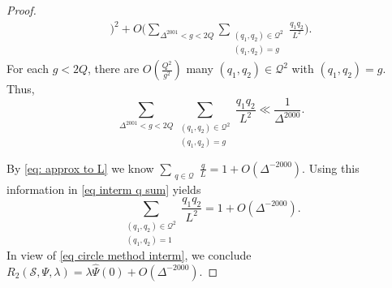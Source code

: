 \documentclass[10pt,a4paper]{amsart}
\begin{document}
\begin{proof}
\begin{align}
\Bigg)^2
+ O\Bigg( 
\sum_{\Delta^{2001}< g < 2Q}
\sum_{\substack{(q_1,q_2)\in \mathcal{Q}^2\\
(q_1,q_2)=g}} \frac{q_1q_2}{L^2}
\Bigg).
\end{align}
For each $g<2Q$, there are 
$O(\frac{Q^2}{g^2})$
many $(q_1,q_2)\in \mathcal{Q}^2$ 
with $(q_1,q_2)=g$. Thus, 
$$
\sum_{\Delta^{2001}< g < 2Q}
\sum_{\substack{(q_1,q_2)\in \mathcal{Q}^2\\
(q_1,q_2)=g}} \frac{q_1q_2}{L^2}
\ll 
\frac{1}{\Delta^{2000}}.
$$

By \eqref{eq: approx to L} we know
$\sum_{\substack{q\in \mathcal{Q}}} \frac{q}{L}
= 1 + O(\Delta^{-2000})$.
Using this information in \eqref{eq interm q sum} 
yields
$$
\sum_{\substack{(q_1,q_2)\in \mathcal{Q}^2\\
(q_1,q_2)=1}} \frac{q_1q_2}{L^2}
= 
1
+ O(\Delta^{-2000}).
$$
In view of \eqref{eq circle method interm}, we conclude 
$R_2(\mathcal{S},\Psi,\lambda)= 
\lambda \widehat{\Psi}(0) + O(\Delta^{-2000})$.
\end{proof}
\end{document}
